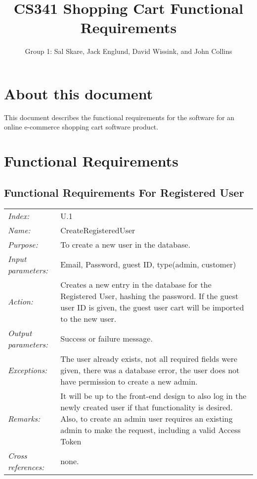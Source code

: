 \documentclass[10pt,letter]{article}
\begin{document}

\title{CS341 Shopping Cart Functional Requirements}

\author{Group 1: Sal Skare, Jack Englund, David Wissink, and John Collins}

\maketitle 

\section{About this document} This document describes the functional requirements for the 
software for an online e-commerce shopping cart software product.

\section{Functional Requirements}

\subsection{Functional Requirements For Registered User}

\begin{tabularx}{\textwidth}{l X}
    \it{Index:} & U.1 \\
    \it{Name:} & CreateRegisteredUser \\
    \it{Purpose:} & To create a new user in the database. \\
    \it{Input parameters:} & Email, Password, guest ID, type(admin, customer)\\
    \it{Action:} & Creates a new entry in the database for the Registered User, hashing the password. If the guest 
    user ID is given, the guest user cart will be imported to the new user.\\
    \it{Output parameters:} & Success or failure message. \\
    \it{Exceptions:} & The user already exists, not all required fields were given, there 
    was a database error, the user does not have permission to create a new admin. \\
    \it{Remarks:} & It will be up to the front-end design to also log in the newly created 
    user if that functionality is desired. Also, to create an admin user requires an existing admin
    to make the request, including a valid Access Token\\
    \it{Cross references:} & none. \\
    \hline
\end{tabularx}
\end{document}
